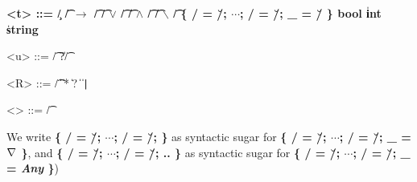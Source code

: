\begin{grammar}
  \bfseries
  <t> ::= \c/ \| \t/ $\bm{\rightarrow}$ \t/
    \alt \t/ $\bm{\vee}$ \t/ \| \t/ $\bm{\wedge}$ \t/ \| \t/ $\bm{\backslash}$ \t/
    \alt [\meta{R}]
    \alt \{ \s/ = \u/; $\cdots{}$; \s/ = \u/; _ = \u/ \}
    \alt bool \| int \| string

  <u> ::= \t/ \| ?\t/

  <R> ::= \t/ \|  \| * \| ?
    \|   \| \texttt{|}

  <\τ> ::= \t/ %
\end{grammar}

We write \textbf{\{ \s/ = \u/; $\cdots{}$; \s/ = \u/; \}} as syntactic
sugar for \textbf{\{ \s/ = \u/; $\cdots{}$; \s/ = \u/; _ = $\nabla$ \}}, and
\textbf{\{ \s/ = \u/; $\cdots{}$; \s/ = \u/; .. \}} as syntactic sugar for
\textbf{\{ \s/ = \u/; $\cdots{}$; \s/ = \u/; _ = \textmd{\emph{Any}} \}})

